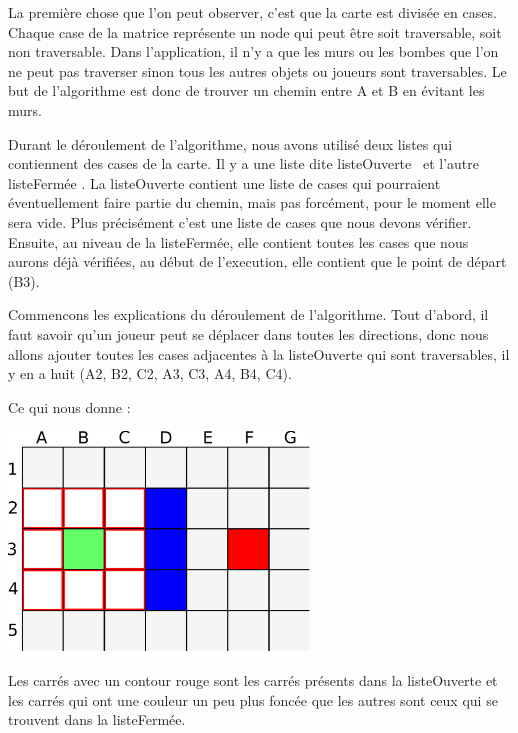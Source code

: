 			La première chose que l'on peut observer, c'est que la carte est divisée en
			cases. Chaque case de la matrice représente un node qui peut être soit
			traversable, soit non traversable. Dans l'application, il n'y a que les murs
			ou les bombes que l'on ne peut pas traverser sinon tous les autres objets
			ou joueurs sont traversables. Le but de l'algorithme est donc de
			trouver un chemin entre A et B en évitant les murs.
			
		
			Durant le déroulement de l'algorithme, nous avons utilisé deux listes qui contiennent des cases de la carte.
			Il y a une liste dite \og listeOuverte \fg \, et l'autre \og listeFermée \fg.
			La listeOuverte contient une liste de cases qui pourraient éventuellement faire partie du chemin, mais pas forcément, pour le moment elle sera vide.
			Plus précisément c'est une liste de cases que nous devons vérifier.
			Ensuite, au niveau de la listeFermée, elle contient toutes les cases que nous
			aurons déjà vérifiées, au début de l'execution, elle contient que le point de départ (B3).
			
		
			Commencons les explications du déroulement de l'algorithme.
			Tout d'abord, il faut savoir qu'un joueur peut se déplacer dans toutes les
			directions, donc nous allons ajouter toutes les cases adjacentes à la
			listeOuverte qui sont traversables, il y en a huit (A2, B2, C2, A3, C3, A4, B4, C4).
			
			
			Ce qui nous donne :
		
			\begin{center}
				\includegraphics[width=8cm]{./Analyse/Img/Grille2.eps}
			\end{center}
		
			Les carrés avec un contour rouge sont les carrés présents dans la
			listeOuverte et les carrés qui ont une couleur un peu plus foncée que les
			autres sont ceux qui se trouvent dans la listeFermée.
		
